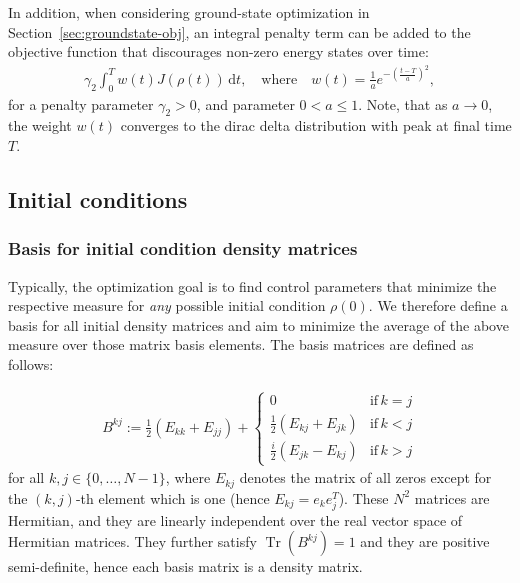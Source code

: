 \documentclass[letterpaper]{article}
\newcommand{\YC}[1]{{\textcolor{Bronze}{#1}}}
\DeclareMathOperator{\Tr}{Tr}
\begin{document}
In addition, when considering ground-state optimization \YC{in
Section~\ref{sec:groundstate-obj}}, an integral penalty term can be added to the objective function that discourages non-zero energy states over time:
\begin{align}
  \gamma_2 \int_0^T w(t) J(\rho(t)) \, \mathrm{d}t, \quad \text{where} \quad w(t) =
  \frac{1}{a} e^{ -\left(\frac{t-T}{a} \right)^2},
\end{align}
for a penalty parameter $\gamma_2 > 0$, and parameter $0 < a \leq 1$. 
Note, that as $a\to 0$, the weight $w(t)$ converges to the dirac delta
distribution with peak at final time $T$. 



\subsection{Initial conditions}\label{subsec:initcond}

\subsubsection{Basis for initial condition density matrices}
Typically, the optimization goal is to find control parameters that minimize the
respective measure for \textit{any} possible initial condition $\rho(0)$. We
therefore define a basis for all initial density matrices and aim to minimize
the average of the above measure over those matrix basis elements. The basis
matrices are defined as follows:

\begin{align}
B^{kj} := \frac 12 \left( E_{kk} + E_{jj}\right) +  \begin{cases} 
          0 & \text{if} \, k=j \\ 
        \frac 12 \left( E_{kj} + E_{jk}\right) & \text{if} \, k<j \\
        \frac i2 \left( E_{jk} - E_{kj}\right) & \text{if} \, k>j
      \end{cases} 
\end{align}
for all $k,j\in\{0,\dots, N-1\}$, where $E_{kj}$ denotes the matrix of all zeros
except for the $(k,j)$-th element which is one (hence $E_{kj} = e_ke_j^T$).
These $N^2$ matrices are Hermitian, and they are linearly independent over the
real vector space of Hermitian matrices. They further satisfy $\Tr(B^{kj}) = 1$
and they are positive semi-definite, hence each basis matrix is a density
matrix. 
\end{document}
